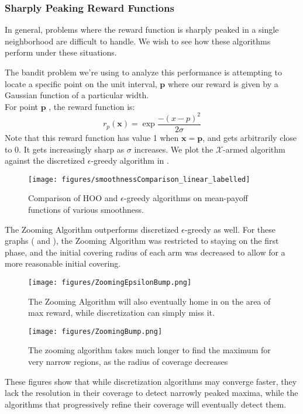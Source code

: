 \subsubsection{Sharply Peaking Reward Functions}
In general, problems where the reward function is sharply peaked in a
single neighborhood are difficult to handle. We wish to see how these
algorithms perform under these situations.

The bandit problem we're using to analyze this performance is
attempting to locate a specific point on the unit interval,
$\mathbf{p}$ where our reward is given by a Gaussian function of a
particular width.\\ For point $\mathbf{p}$ , the reward function is:
\[
	r_p(\mathbf{x}) = \exp{\frac{-(x-p)^2}{2\sigma}}
\]
Note that this reward function has value 1 when $\mathbf{x}
= \mathbf{p}$, and gets arbitrarily close to 0.  It gets increasingly
sharp as $\sigma$ increases.  We plot the $\mathcal{X}$-armed
algorithm against the discretized $\epsilon$-greedy algorithm in
.

\begin{figure}[!ht]
  \begin{center}
    \texttt{[image: figures/smoothnessComparison\_linear\_labelled]}
     \caption{Comparison of HOO and $\epsilon$-greedy algorithms on
       mean-payoff functions of various smoothness.}
     \label{fig:smoothness2}
  \end{center}
\end{figure}

The Zooming Algorithm outperforms discretized $\epsilon$-greedy as
well.  For these graphs ( and
), the Zooming Algorithm was restricted to
staying on the first phase, and the initial covering radius of each
arm was decreased to allow for a more reasonable initial covering.


\begin{figure}[!ht]
  \begin{center}
    \texttt{[image: figures/ZoomingEpsilonBump.png]}
     \caption{The Zooming Algorithm will also eventually home in on the area of max reward, while discretization can simply miss it.}
     \label{fig:zoomebump}
  \end{center}
\end{figure}

\begin{figure}[!ht]
  \begin{center}
    \texttt{[image: figures/ZoomingBump.png]}
     \caption{The zooming algorithm takes much longer to find the maximum for very narrow regions, as the radius of coverage decreases }
     \label{fig:zoombump2}
  \end{center}
\end{figure}



These figures show that while discretization algorithms may converge
faster, they lack the resolution in their coverage to detect narrowly
peaked maxima, while the algorithms that progressively refine their
coverage will eventually detect them.
